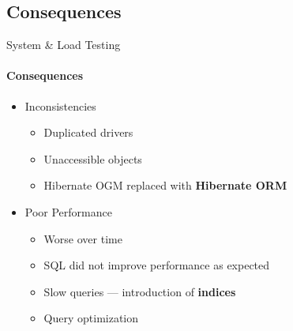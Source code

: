 \subsection{Consequences}
\begin{frame}{System \& Load Testing}
        \framesubtitle{Consequences}
        \begin{itemize}
            \item<1-> Inconsistencies
                \begin{itemize}
                    \item<1-> Duplicated drivers
                    \item<1-> Unaccessible objects
                    \item<2-> Hibernate OGM replaced with \textbf{Hibernate ORM}
                \end{itemize}
            \item<3-> Poor Performance
                \begin{itemize}
                    \item<3-> Worse over time
                    \item<3-> SQL did not improve performance as expected
                    \item<4-> Slow queries --- introduction of \textbf{indices}
                    \item<4-> Query optimization
                \end{itemize}
        \end{itemize}
\end{frame}
